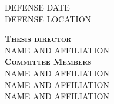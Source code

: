 \begin{titlepage}
\begin{center}
\textsc{DEFENSE DATE}\\
\textsc{DEFENSE LOCATION}\\
\vspace*{0.75cm}
\begin{Large}
\textbf{\textsc{Thesis director}}\\[0.75ex]
\textsc{NAME AND AFFILIATION}\\
\vspace*{0.75cm}
\textbf{\textsc{Committee Members}}\\[0.75ex]
\textsc{NAME AND AFFILIATION}\\
\textsc{NAME AND AFFILIATION}\\
\textsc{NAME AND AFFILIATION}\\
\vspace*{0.75cm}

\end{Large}
\end{center}
\end{titlepage}

